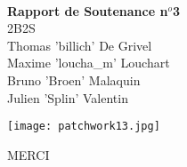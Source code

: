 \documentclass[14pt,a4paper]{report}
\begin{document}
\pagestyle{empty}

\begin{center}
\rule{0cm}{19mm} \\

{\Huge \textbf{Rapport de Soutenance n$^o$3}} \\[23mm]

{\huge 2B2S} \\[8mm]

Thomas 'billich' De Grivel \\
Maxime 'loucha\_m' Louchart \\
Bruno 'Broen' Malaquin \\
Julien 'Splin' Valentin \\[32mm]

\centerline{{\texttt{[image: patchwork13.jpg]}}}

\end{center}

\newpage
\setcounter{page}{1}

\tableofcontents

\newpage










\newpage
\begin{center}
MERCI
\end{center}
\end{document}
